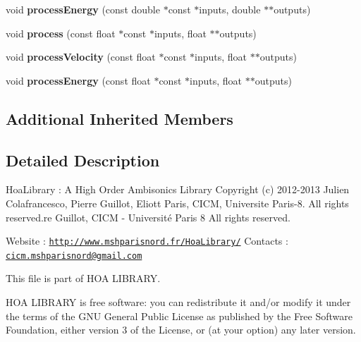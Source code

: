 \begin{DoxyCompactItemize}
\item 
\hypertarget{class_ambisonic_vector_ad8a21b27864999d7d4c59a199bcc07ef}{void {\bfseries process\-Energy} (const double $\ast$const $\ast$inputs, double $\ast$$\ast$outputs)}\label{class_ambisonic_vector_ad8a21b27864999d7d4c59a199bcc07ef}

\item 
\hypertarget{class_ambisonic_vector_a24ad1309b22b3b91bc148f8c066d75c7}{void {\bfseries process} (const float $\ast$const $\ast$inputs, float $\ast$$\ast$outputs)}\label{class_ambisonic_vector_a24ad1309b22b3b91bc148f8c066d75c7}

\item 
\hypertarget{class_ambisonic_vector_a08d22321578374ad7f99fc9ff9323aa0}{void {\bfseries process\-Velocity} (const float $\ast$const $\ast$inputs, float $\ast$$\ast$outputs)}\label{class_ambisonic_vector_a08d22321578374ad7f99fc9ff9323aa0}

\item 
\hypertarget{class_ambisonic_vector_ae9758b735e9bd57e2f2c3b21d1350e3b}{void {\bfseries process\-Energy} (const float $\ast$const $\ast$inputs, float $\ast$$\ast$outputs)}\label{class_ambisonic_vector_ae9758b735e9bd57e2f2c3b21d1350e3b}

\end{DoxyCompactItemize}
\subsection*{Additional Inherited Members}


\subsection{Detailed Description}
Hoa\-Library \-: A High Order Ambisonics Library Copyright (c) 2012-\/2013 Julien Colafrancesco, Pierre Guillot, Eliott Paris, C\-I\-C\-M, Universite Paris-\/8. All rights reserved.\-re Guillot, C\-I\-C\-M -\/ Université Paris 8 All rights reserved.

Website \-: \href{http://www.mshparisnord.fr/HoaLibrary/}{\tt http\-://www.\-mshparisnord.\-fr/\-Hoa\-Library/} Contacts \-: \href{mailto:cicm.mshparisnord@gmail.com}{\tt cicm.\-mshparisnord@gmail.\-com}

This file is part of H\-O\-A L\-I\-B\-R\-A\-R\-Y.

H\-O\-A L\-I\-B\-R\-A\-R\-Y is free software\-: you can redistribute it and/or modify it under the terms of the G\-N\-U General Public License as published by the Free Software Foundation, either version 3 of the License, or (at your option) any later version.

